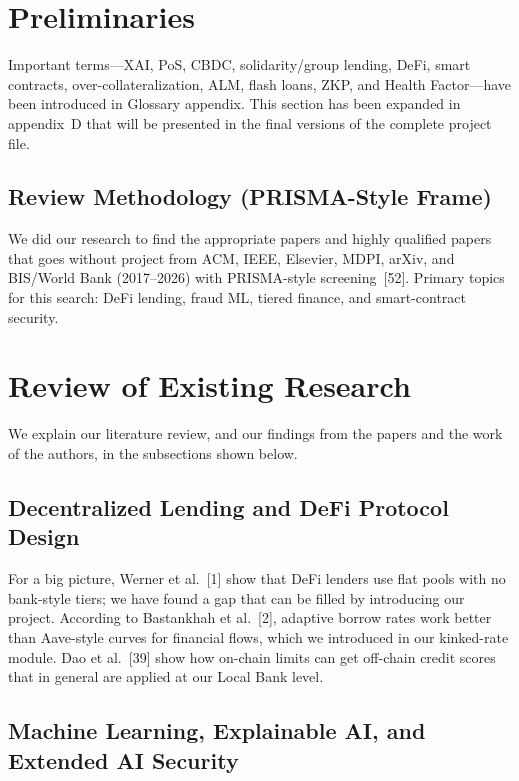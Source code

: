 
\section{Preliminaries}
\label{sec:preliminaries}

Important terms---XAI, PoS, CBDC, solidarity/group lending, DeFi, smart contracts, over-collateralization, ALM, flash loans, ZKP, and Health Factor---have been introduced in Glossary appendix. This section has been expanded in appendix~D that will be presented in the final versions of the complete project file.

\subsection{Review Methodology (PRISMA-Style Frame)}
\label{sec:lit-prisma}

We did our research to find the appropriate papers and highly qualified papers that goes without project from ACM, IEEE, Elsevier, MDPI, arXiv, and BIS/World Bank (2017--2026) with PRISMA-style screening~[52]. Primary topics for this search: DeFi lending, fraud ML, tiered finance, and smart-contract security.



\section{Review of Existing Research}
\label{sec:review-existing}

We explain our literature review, and our findings from the papers and the work of the authors, in the subsections shown below.

\subsection{Decentralized Lending and DeFi Protocol Design}

For a big picture, Werner et al.~[1] show that DeFi lenders use flat pools with no bank-style tiers; we have found a gap that can be filled by introducing our project. According to Bastankhah et al.~[2], adaptive borrow rates work better than Aave-style curves for financial flows, which we introduced in our kinked-rate module. Dao et al.~[39] show how on-chain limits can get off-chain credit scores that in general are applied at our Local Bank level.

\subsection{Machine Learning, Explainable AI, and Extended AI Security}

